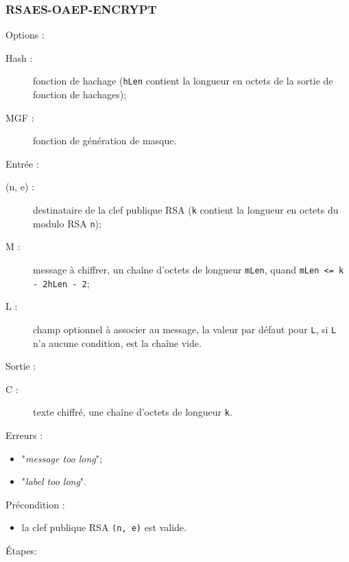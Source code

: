 \subsubsection{RSAES-OAEP-ENCRYPT}
Options :
\begin{description}
\item [Hash :] fonction de hachage (\texttt{hLen} contient la longueur en octets de la sortie de fonction de hachages);
\item [MGF :] fonction de génération de masque.\\
\end{description}
Entrée :
\begin{description}
\item [(n, e) : ] destinataire de la clef publique RSA (\texttt{k} contient la longueur en octets du modulo RSA \texttt{n});
\item [M : ] message à chiffrer, un chaîne d'octets de longueur \texttt{mLen}, quand \texttt{mLen <= k - 2hLen - 2};
\item [L : ] champ optionnel à associer au message, la valeur par défaut pour \texttt{L}, si \texttt{L} n'a aucune condition, est la chaîne vide.\\
\end{description}
Sortie :
\begin{description}
\item [C : ] texte chiffré, une chaîne d'octets de longueur \texttt{k}.\\
\end{description}
Erreurs :
\begin{itemize}
\item "\textit{message too long}";
\item "\textit{label too long}".\\
\end{itemize}
Précondition :
\begin{itemize}
\item la clef publique RSA \texttt{(n, e)} est valide.\\
\end{itemize}
Étapes:
